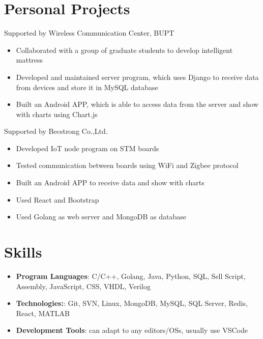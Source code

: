 \documentclass{resume}
\begin{document}
\section{Personal Projects}
Supported by Wireless Communication Center, BUPT
\begin{itemize}[parsep=0.25ex]
    \item Collaborated with a group of graduate students to develop intelligent mattress
    \item Developed and maintained server program, which uses Django to receive data from devices and store it in MySQL database
    \item Built an Android APP, which is able to access data from the server and show with charts using Chart.js
\end{itemize}
Supported by Becstrong Co.,Ltd.
\begin{itemize}[parsep=0.25ex]
    \item Developed IoT node program on STM boards
    \item Tested communication between boards using WiFi and Zigbee protocol
    \item Built an Android APP to receive data and show with charts
\end{itemize}
\begin{itemize}[parsep=0.25ex]
    \item Used React and Bootstrap
    \item Used Golang as web server and MongoDB as database
\end{itemize}

\section{Skills}
\begin{itemize}[parsep=0.25ex]
    \item
          \textbf{Program Languages}:
          C/C++, Golang, Java, Python, SQL, Sell Script, Assembly, JavaScript, CSS, VHDL, Verilog
    \item
          \textbf{Technologies:}:
          Git, SVN, Linux, MongoDB, MySQL, SQL Server, Redis, React, MATLAB
    \item
          \textbf{Development Tools}:
          can adapt to any editors/OSs, usually use VSCode
\end{itemize}
\end{document}
